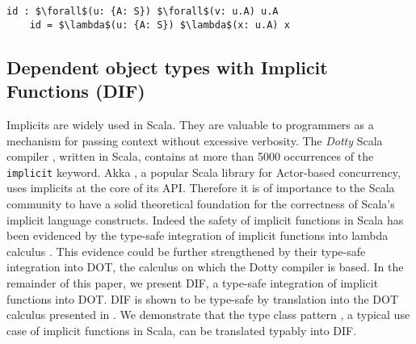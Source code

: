 \begin{minipage}{\linewidth}
\begin{lstlisting}[mathescape]
    id : $\forall$(u: {A: S}) $\forall$(v: u.A) u.A
    id = $\lambda$(u: {A: S}) $\lambda$(x: u.A) x
\end{lstlisting}
\end{minipage}

\subsection{Dependent object types with Implicit Functions (DIF)}
Implicits are widely used in Scala. They are valuable to programmers as a
mechanism for passing context without excessive verbosity. The \emph{Dotty}
Scala compiler \cite{O17}, written in Scala, contains at more than 5000
occurrences of the \texttt{implicit} keyword. Akka \cite{H12}, a popular Scala
library for Actor-based concurrency, uses implicits at the core of its API.
Therefore it is of importance to the Scala community to have a solid theoretical
foundation for the correctness of Scala's implicit language constructs. Indeed
the safety of implicit functions in Scala has been evidenced by the type-safe
integration of implicit functions into lambda calculus \cite{OBLB18}. This
evidence could be further strengthened by their type-safe integration into DOT,
the calculus on which the Dotty compiler is based. In the remainder of this
paper, we present DIF, a type-safe integration of implicit functions into DOT.
DIF is shown to be type-safe by translation into the DOT calculus presented in
\cite{AGORS16}. We demonstrate that the type class pattern \cite{OMO10}, a
typical use case of implicit functions in Scala, can be translated typably into
DIF.


